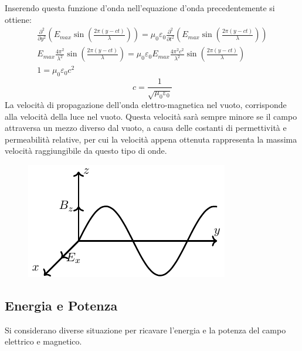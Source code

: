 \documentclass{article}
\numberwithin{equation}{subsection}
\begin{document}
Inserendo questa funzione d'onda nell'equazione d'onda precedentemente si ottiene:
\begin{gather*}
    \displaystyle\frac{\partial^2}{\partial y^2}\left(E_{max}\sin\left(\displaystyle\frac{2\pi (y-ct)}{\lambda}\right)\right)=\mu_0\varepsilon_0\frac{\partial^2}{\partial t^2}\left(E_{max}\sin\left(\displaystyle\frac{2\pi (y-ct)}{\lambda}\right)\right)\\
    \displaystyle E_{max}\frac{4\pi^2}{\lambda^2}\sin\left(\frac{2\pi (y-ct)}{\lambda}\right)=\mu_0\varepsilon_0E_{max}\frac{4\pi^2c^2}{\lambda^2}\sin\left(\frac{2\pi (y-ct)}{\lambda}\right)\\
    1=\mu_0\varepsilon_0c^2
\end{gather*}
\begin{equation}
    c=\displaystyle\frac{1}{\sqrt{\mu_0\varepsilon_0}}
\end{equation}
La velocità di propagazione dell'onda elettro-magnetica nel vuoto, corrisponde alla velocità della luce nel vuoto. Questa velocità sarà sempre minore se il campo attraversa 
un mezzo diverso dal vuoto, a causa delle costanti di permettività e permeabilità relative, per cui la velocità appena ottenuta rappresenta la massima velocità raggiungibile 
da questo tipo di onde. 

\begin{figure}[H]%
    \centering
    \includegraphics{onda-elettro-magnetica.pdf}
    \label{fig:onta-elettro-magnetica}
\end{figure}

\subsection{Energia e Potenza}

Si considerano diverse situazione per ricavare l'energia e la potenza del campo elettrico e magnetico.
\end{document}
